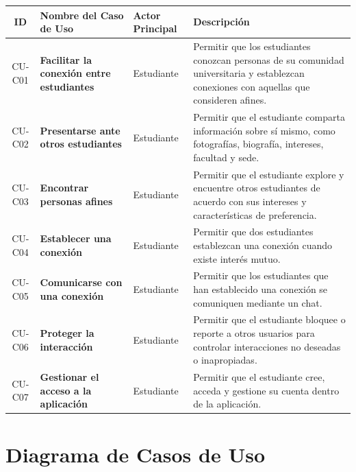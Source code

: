 \documentclass[11pt,a4paper]{article}
\begin{document}
\begin{center}
\begin{tabularx}{\textwidth}{|c|X|X|X|}
\hline
\rowcolor{gray!25}
\textbf{ID} &
\textbf{Nombre del Caso de Uso} &
\textbf{Actor Principal} &
\textbf{Descripción} \\
\hline

CU-C01 &
\textbf{Facilitar la conexión entre estudiantes} &
Estudiante &
Permitir que los estudiantes conozcan personas de su comunidad universitaria y establezcan conexiones con aquellas que consideren afines. \\
\hline

CU-C02 &
\textbf{Presentarse ante otros estudiantes} &
Estudiante &
Permitir que el estudiante comparta información sobre sí mismo, como fotografías, biografía, intereses, facultad y sede. \\
\hline

CU-C03 &
\textbf{Encontrar personas afines} &
Estudiante &
Permitir que el estudiante explore y encuentre otros estudiantes de acuerdo con sus intereses y características de preferencia. \\
\hline

CU-C04 &
\textbf{Establecer una conexión} &
Estudiante &
Permitir que dos estudiantes establezcan una conexión cuando existe interés mutuo. \\
\hline

CU-C05 &
\textbf{Comunicarse con una conexión} &
Estudiante &
Permitir que los estudiantes que han establecido una conexión se comuniquen mediante un chat. \\
\hline

CU-C06 &
\textbf{Proteger la interacción} &
Estudiante &
Permitir que el estudiante bloquee o reporte a otros usuarios para controlar interacciones no deseadas o inapropiadas. \\
\hline

CU-C07 &
\textbf{Gestionar el acceso a la aplicación} &
Estudiante &
Permitir que el estudiante cree, acceda y gestione su cuenta dentro de la aplicación. \\
\hline

\end{tabularx}
\end{center}


\section{Diagrama de Casos de Uso}
\end{document}
